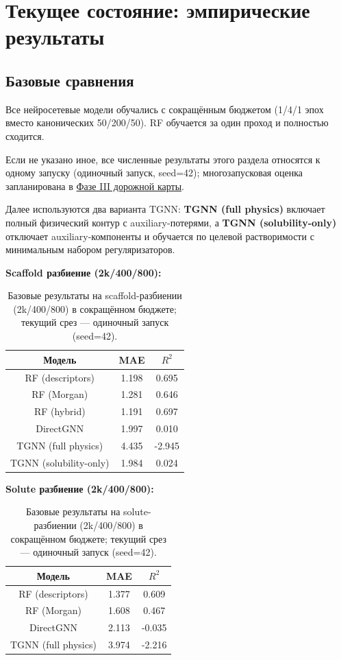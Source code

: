 \documentclass[11pt]{article}
\begin{document}
\section{Текущее состояние: эмпирические результаты}

\subsection{Базовые сравнения}

Все нейросетевые модели обучались с сокращённым бюджетом (1/4/1 эпох вместо канонических 50/200/50). RF обучается за один проход и полностью сходится.

Если не указано иное, все численные результаты этого раздела относятся к одному запуску (одиночный запуск, seed=42); многозапусковая оценка запланирована в \hyperref[subsec:roadmap-phase3]{Фазе III дорожной карты}.

Далее используются два варианта TGNN: \textbf{TGNN (full physics)} включает полный физический контур с auxiliary-потерями, а \textbf{TGNN (solubility-only)} отключает auxiliary-компоненты и обучается по целевой растворимости с минимальным набором регуляризаторов.

\textbf{Scaffold разбиение (2k/400/800):}

\begin{table}[H]
\centering
\begin{tabular}{|c|c|c|}
\hline
Модель & MAE & $R^2$ \\
\hline
RF (descriptors) & 1.198 & 0.695 \\
\hline
RF (Morgan) & 1.281 & 0.646 \\
\hline
RF (hybrid) & 1.191 & 0.697 \\
\hline
DirectGNN & 1.997 & 0.010 \\
\hline
TGNN (full physics) & 4.435 & -2.945 \\
\hline
TGNN (solubility-only) & 1.984 & 0.024 \\
\hline
\end{tabular}
\caption{Базовые результаты на scaffold-разбиении (2k/400/800) в сокращённом бюджете; текущий срез --- одиночный запуск (seed=42).}
\end{table}

\textbf{Solute разбиение (2k/400/800):}

\begin{table}[H]
\centering
\begin{tabular}{|c|c|c|}
\hline
Модель & MAE & $R^2$ \\
\hline
RF (descriptors) & 1.377 & 0.609 \\
\hline
RF (Morgan) & 1.608 & 0.467 \\
\hline
DirectGNN & 2.113 & -0.035 \\
\hline
TGNN (full physics) & 3.974 & -2.216 \\
\hline
\end{tabular}
\caption{Базовые результаты на solute-разбиении (2k/400/800) в сокращённом бюджете; текущий срез --- одиночный запуск (seed=42).}
\end{table}
\end{document}
